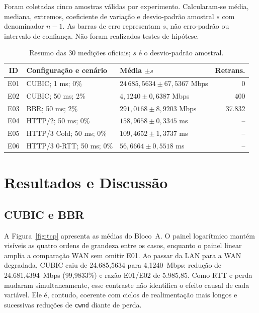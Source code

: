 \documentclass[12pt]{article}
\begin{document}
Foram coletadas cinco amostras válidas por experimento. Calcularam-se média, mediana, extremos, coeficiente de variação e desvio-padrão amostral $s$ com denominador $n-1$. As barras de erro representam $s$, não erro-padrão ou intervalo de confiança. Não foram realizados testes de hipótese.

\begin{table}[!ht]
\centering
\caption{Resumo das 30 medições oficiais; $s$ é o desvio-padrão amostral.}
\label{tab:resultados}
\small
\begin{tabularx}{\textwidth}{@{}c>{\raggedright\arraybackslash}X>{\raggedright\arraybackslash}Xr@{}}
\toprule
ID & Configuração e cenário & Média $\pm s$ & Retrans. \\
\midrule
E01 & CUBIC; 1 ms; 0\% & $24\,685{,}5634 \pm 67{,}5367$ Mbps & 0 \\
E02 & CUBIC; 50 ms; 2\% & $4{,}1240 \pm 0{,}6387$ Mbps & 400 \\
E03 & BBR; 50 ms; 2\% & $291{,}0168 \pm 8{,}9203$ Mbps & 37.832 \\
E04 & HTTP/2; 50 ms; 0\% & $158{,}9658 \pm 0{,}3345$ ms & -- \\
E05 & HTTP/3 Cold; 50 ms; 0\% & $109{,}4652 \pm 1{,}3737$ ms & -- \\
E06 & HTTP/3 0-RTT; 50 ms; 0\% & $56{,}6664 \pm 0{,}5518$ ms & -- \\
\bottomrule
\end{tabularx}
\end{table}

\section{Resultados e Discussão}

\subsection{CUBIC e BBR}

A Figura~\ref{fig:tcp} apresenta as médias do Bloco~A. O painel logarítmico mantém visíveis as quatro ordens de grandeza entre os casos, enquanto o painel linear amplia a comparação WAN sem omitir E01. Ao passar da LAN para a WAN degradada, CUBIC caiu de 24.685,5634 para 4,1240~Mbps: redução de 24.681,4394~Mbps (99,9833\%) e razão E01/E02 de 5.985,85. Como RTT e perda mudaram simultaneamente, esse contraste não identifica o efeito causal de cada variável. Ele é, contudo, coerente com ciclos de realimentação mais longos e sucessivas reduções de \texttt{cwnd} diante de perda.
\end{document}
